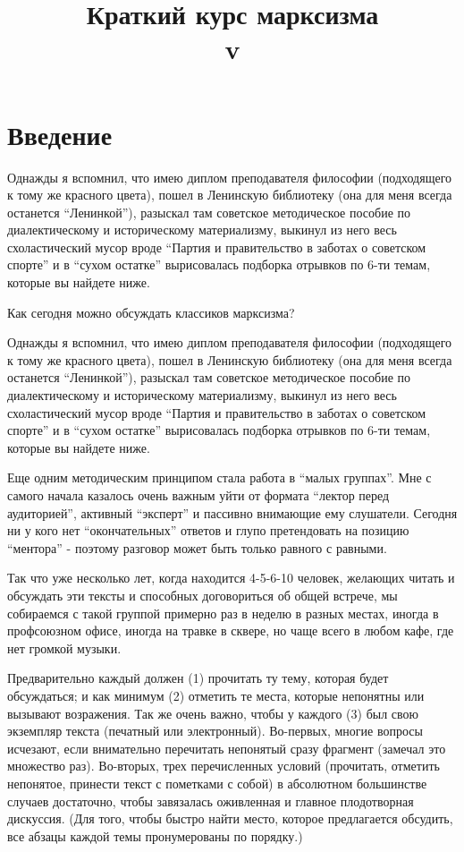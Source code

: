 \documentclass[12pt]{article}
\date{}
\title{%
  Краткий курс марксизма \\
  \large v}
\begin{document}
\maketitle

\tableofcontents

\newpage

\section*{Введение}
\label{sec:intro}


Однажды я вспомнил, что имею диплом преподавателя философии (подходящего к тому же красного цвета), пошел в Ленинскую библиотеку (она для меня всегда останется “Ленинкой”), разыскал там советское методическое пособие по диалектическому и историческому материализму, выкинул из него весь схоластический мусор вроде “Партия и правительство в заботах о советском спорте” и в “сухом остатке” вырисовалась подборка отрывков по 6-ти темам, которые вы найдете ниже.

Как сегодня можно обсуждать классиков марксизма?

Однажды я вспомнил, что имею диплом преподавателя философии (подходящего к тому же красного цвета), пошел в Ленинскую библиотеку (она для меня всегда останется “Ленинкой”), разыскал там советское методическое пособие по диалектическому и историческому материализму, выкинул из него весь схоластический мусор вроде “Партия и правительство в заботах о советском спорте” и в “сухом остатке” вырисовалась подборка отрывков по 6-ти темам, которые вы найдете ниже.

Еще одним методическим принципом стала работа в “малых группах”. Мне с самого начала казалось очень важным уйти от формата “лектор перед аудиторией”, активный “эксперт” и пассивно внимающие ему слушатели. Сегодня ни у кого нет “окончательных” ответов и глупо претендовать на позицию “ментора” - поэтому разговор может быть только равного с равными.

Так что уже несколько лет, когда находится 4-5-6-10 человек, желающих читать и обсуждать эти тексты и способных договориться об общей встрече, мы собираемся с такой группой примерно раз в неделю в разных местах, иногда в профсоюзном офисе, иногда на травке в сквере, но чаще всего в любом кафе, где нет громкой музыки.

Предварительно каждый должен (1) прочитать ту тему, которая будет обсуждаться; и как минимум (2) отметить те места, которые непонятны или вызывают возражения. Так же очень важно, чтобы у каждого (3) был свою экземпляр текста (печатный или электронный). Во-первых, многие вопросы исчезают, если внимательно перечитать непонятый сразу фрагмент (замечал это множество раз). Во-вторых, трех перечисленных условий (прочитать, отметить непонятое, принести текст с пометками с собой) в абсолютном большинстве случаев достаточно, чтобы завязалась оживленная и главное плодотворная дискуссия. (Для того, чтобы быстро найти место, которое предлагается обсудить, все абзацы каждой темы пронумерованы по порядку.)
\end{document}
